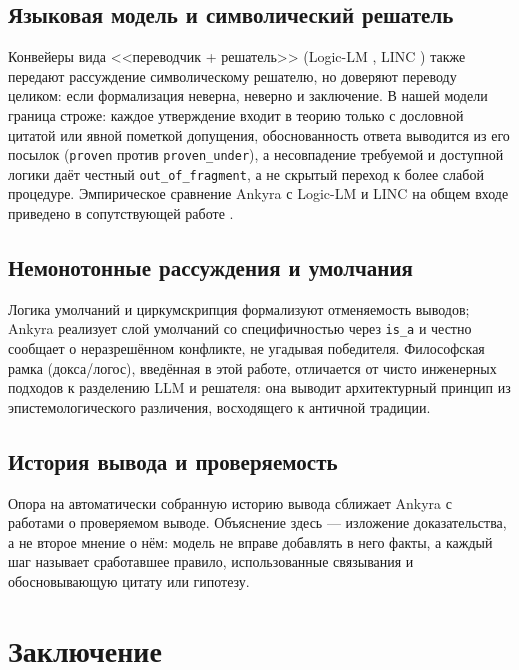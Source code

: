 \documentclass[12pt,a4paper]{article}
\begin{document}
\subsection{Языковая модель и символический решатель}
\label{sec:translator_solver}

Конвейеры вида <<переводчик + решатель>> (Logic-LM \cite{logiclm}, LINC \cite{linc}) также передают рассуждение символическому
решателю, но доверяют переводу целиком: если формализация неверна, неверно и заключение. В нашей модели
граница строже: каждое утверждение входит в теорию только с дословной цитатой или явной пометкой допущения,
обоснованность ответа выводится из его посылок (\texttt{proven} против \texttt{proven\_under}), а несовпадение
требуемой и доступной логики даёт честный \texttt{out\_of\_fragment}, а не скрытый переход к более слабой
процедуре. Эмпирическое сравнение Ankyra с Logic-LM и LINC на общем входе приведено в сопутствующей работе \cite{ankyra_paper}.

\subsection{Немонотонные рассуждения и умолчания}
\label{sec:nonmono_related}

Логика умолчаний \cite{reiter} и циркумскрипция \cite{mccarthy} формализуют отменяемость выводов; Ankyra реализует слой умолчаний
со специфичностью через \texttt{is\_a} и честно сообщает о неразрешённом конфликте, не угадывая победителя.
Философская рамка (докса/логос), введённая в этой работе, отличается от чисто инженерных подходов к разделению
LLM и решателя: она выводит архитектурный принцип из эпистемологического различения, восходящего к античной традиции.

\subsection{История вывода и проверяемость}
\label{sec:proof_history}

Опора на автоматически собранную историю вывода сближает Ankyra с работами о проверяемом выводе. Объяснение здесь
--- изложение доказательства, а не второе мнение о нём: модель не вправе добавлять в него факты, а каждый шаг
называет сработавшее правило, использованные связывания и обосновывающую цитату или гипотезу.

\section{Заключение}
\label{sec:conclusion}
\end{document}
